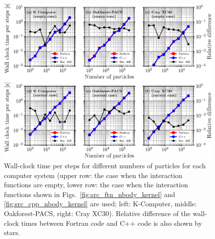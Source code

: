 \documentclass[proof,useamsfonts]{pasj01}
\begin{document}
\begin{figure}[h]
\begin{center}
\includegraphics[width=0.95\linewidth]{figures/nbody_comp}
\end{center}
\caption{Wall-clock time per steps for different numbers of particles for each computer system (upper row: the case when the interaction functions are empty, lower row: the case when the interaction functions shown in Figs.~\ref{fig:src_ftn_nbody_kernel} and \ref{fig:src_cpp_nbody_kernel} are used; left: K-Computer, middle: Oakforest-PACS, right: Cray XC30). Relative difference of the wall-clock times between Fortran code and C++ code is also shown by stars.}
\label{fig:nbody_comp}  

\end{figure}

\end{document}
